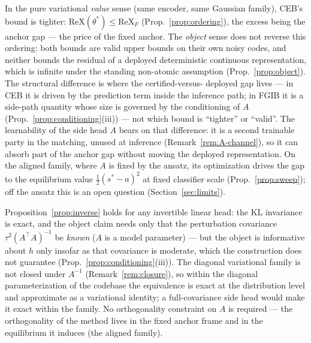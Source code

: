 \begin{remark}\label{rem:senses}
In the pure variational \emph{value} sense (same encoder, same Gaussian family), CEB's
bound is tighter: $\mathrm{ReX}(\theta^*) \le \mathrm{ReX}_F$
(Prop.~\ref{prop:ordering}), the excess being the anchor gap --- the price of the fixed
anchor. The \emph{object} sense does not reverse this ordering: both bounds are valid
upper bounds on their own noisy codes, and neither bounds the residual of a deployed
deterministic continuous representation, which is infinite under the standing
non-atomic assumption (Prop.~\ref{prop:object}). The structural difference is where the certified-versus-
deployed gap lives --- in CEB it is driven by the prediction term inside the inference
path; in FGIB it is a side-path quantity whose size is governed by the conditioning of
$A$ (Prop.~\ref{prop:conditioning}(iii)) --- not which bound is ``tighter'' or
``valid''. The learnability of the side head $A$ bears on that difference: it is a
second trainable party in the matching, unused at inference
(Remark~\ref{rem:A-channel}), so it can absorb part of the anchor gap without moving
the deployed representation. On the aligned family, where $A$ is fixed by the ansatz,
its optimization drives the gap to the equilibrium value $\tfrac12(s^*-a)^2$ at fixed
classifier scale (Prop.~\ref{prop:sweep}); off the ansatz this is an open question
(Section~\ref{sec:limits}).
\end{remark}

\begin{remark}\label{rem:orth}
Proposition~\ref{prop:inverse} holds for any invertible linear head: the KL invariance
is exact, and the object claim needs only that the perturbation covariance
$\tau^2(A^{\top}A)^{-1}$ be \emph{known} ($A$ is a model parameter) --- but the
object is informative about $h$ only insofar as that covariance is moderate, which the
construction does not guarantee (Prop.~\ref{prop:conditioning}(iii)). The diagonal
variational family is not closed under $A^{-1}$ (Remark~\ref{rem:closure}), so within
the diagonal parameterization of the codebase the equivalence is exact at the
distribution level and approximate as a variational identity; a full-covariance side
head would make it exact within the family. No orthogonality constraint on $A$ is
required --- the orthogonality of the method lives in the fixed anchor frame and in the
equilibrium it induces (the aligned family).
\end{remark}

